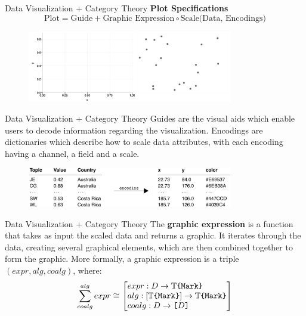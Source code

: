 \documentclass[aspectratio=169,xcolor=dvipsnames,10pt]{beamer}
\theoremstyle{definition}
\begin{document}
\begin{frame}[fragile]{Data Visualization + Category Theory}
    \textbf{Plot Specifications}
    $$\text{Plot} = \text{Guide} + \text{Graphic Expression} \circ \text{Scale(Data, Encodings)}$$
  \begin{figure}
    \begin{center}
        \includegraphics[width=0.8\textwidth]{./figs/frame_graphic.pdf}
    \end{center}
  \end{figure}
\end{frame}

\begin{frame}[fragile]{Data Visualization + Category Theory}
  Guides are the visual aids which
  enable users to decode information regarding the visualization.
  Encodings are dictionaries which describe how to scale
  data attributes, with each encoding having a channel, a field and
  a scale.
  \begin{figure}
    \begin{center}
        \includegraphics[width=0.8\textwidth]{./figs/scaleddata.pdf}
    \end{center}
  \end{figure}
\end{frame}

\begin{frame}[fragile]{Data Visualization + Category Theory}
  The \textbf{graphic expression} is a function that takes as input
  the scaled data and returns a graphic. It iterates through the data,
  creating several graphical elements, which are then combined together
  to form the graphic. More formally, a graphic expression is a triple
  $(expr,alg,coalg)$, where:
    \begin{align*}
        \sum^{alg}_{coalg}expr \cong \left[
        \begin{array}{@{}c@{}}
            \begin{aligned}
                &expr : D\to \mathbb T \texttt{\{Mark\}} \\
                &alg : [\mathbb T \texttt{\{Mark\}}]\to \mathbb T\texttt{\{Mark\}} \\
                &coalg : D\to \texttt{[}D\texttt{]}
            \end{aligned}
        \end{array}
    \right] 
    \end{align*}
\end{frame}
\end{document}
